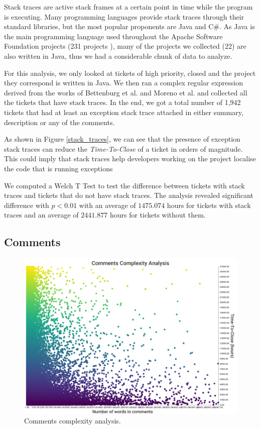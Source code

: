 \documentclass{mpaper}
\begin{document}
Stack traces are active stack frames at a certain point in time while the program is executing. 
Many programming languages provide stack traces through their standard libraries, but the most 
popular proponents are Java and C\#. As Java is the main programming language used throughout 
the Apache Software Foundation projects (231 projects \cite{apache_projects}), many of the projects 
we collected (22) are also written in Java, thus we had a considerable chunk of data to analyze.

For this analysis, we only looked at tickets of high priority, closed and the project they correspond 
is written in Java. We then ran a complex regular expression derived from the works of Bettenburg et al. 
\cite{bettenburg2012using} and Moreno et al. \cite{moreno2014use} and collected all the tickets that have 
stack traces. In the end, we got a total number of 1,942 tickets that had at least an exception stack trace 
attached in either summary, description or any of the comments.

As shown in Figure \ref{stack_traces}, we can see that the presence of exception stack traces can 
reduce the \emph{Time-To-Close} of a ticket in orders of magnitude. This could imply that stack traces help 
developers working on the project localise the code that is running exceptions 

We computed a Welch T Test to test the difference between tickets with stack traces and tickets that 
do not have stack traces. The analysis revealed significant difference with $p < 0.01$ with an
average of $1475.074$ hours for tickets with stack traces and an average of $2441.877$ hours
for tickets without them.

\subsection{Comments}

\begin{figure}[ht]
  \begin{center}
    \includegraphics[scale=0.18]{images/comment_complexity.png}
  \end{center}
  \caption{\label{comments}Comments complexity analysis.}
\end{figure}
\end{document}
